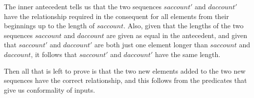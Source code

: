 \documentclass[11pt]{amsart}
\begin{document}
%

The inner antecedent tells us that the two sequences $saccount'$ and $daccount'$ have the relationship required in the consequent for all elements from their beginnings up to the length of $saccount$. Also, given that the lengths of the two sequences $saccount$ and $daccount$ are given as equal in the antecedent, and given that $saccount'$ and $daccount'$ are both just one element longer than $saccount$ and $daccount$, it follows that $saccount'$ and $daccount'$ have the same length. 

Then all that is left to prove is that the two new elements added to the two new sequences have the correct relationship, and this follows from the predicates that give us conformality of inputs.

%
\end{document}
